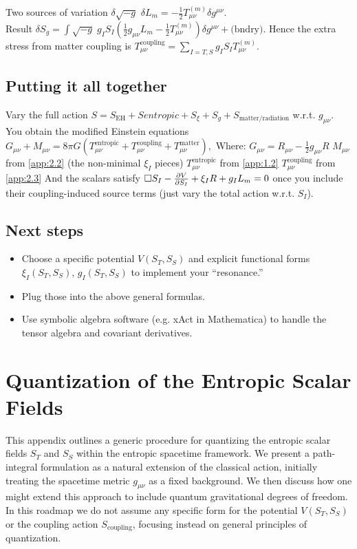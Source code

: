\documentclass[11pt,a4paper]{article} %
\newcommand{\ST}{S_T}
\newcommand{\SSp}{S_S} %
\newcommand{\SEH}{S_{\text{EH}}}
\newcommand{\Smatterradiation}{S_{\text{matter/radiation}}}
\newcommand{\Lm}{L_m}
\newcommand{\Mmu}{M} %
\newcommand{\Tmnentropic}{T^{\text{entropic}}_{\mu\nu}}
\newcommand{\Tmncoupling}{T^{\text{coupling}}_{\mu\nu}}
\newcommand{\Tmnmatter}{T^{\text{matter}}_{\mu\nu}}
\newcommand{\Tmnm}{T^{(m)}_{\mu\nu}} %
\begin{document}
Two sources of variation
$\delta\sqrt{-g}$
$\delta\Lm=-\frac{1}{2}\Tmnm\delta g^{\mu\nu}.$ \\
Result
$\delta S_g =\int\sqrt{-g}\;g_I S_I\left(\frac{1}{2}g_{\mu\nu}\Lm-\frac{1}{2}\Tmnm\right)\delta g^{\mu\nu} +\text{(bndry)}.$
Hence the extra stress from matter coupling is
$\Tmncoupling=\sum_{I=T,S}g_I S_I\Tmnm.$

\subsection{Putting it all together}
\label{app:B.4}
Vary the full action
$S=\SEH+Sentropic+S_\xi+S_g+\Smatterradiation$
w.r.t. $g_{\mu\nu}$. You obtain the modified Einstein equations
$G_{\mu\nu}+\Mmu_{\mu\nu}=8\pi G(\Tmnentropic+\Tmncoupling+\Tmnmatter),$
Where:
$G_{\mu\nu}=R_{\mu\nu}-\frac{1}{2}g_{\mu\nu}R$
$\Mmu_{\mu\nu}$ from \cref{app:2.2} (the non-minimal $\xi_I$ pieces)
$\Tmnentropic$ from \cref{app:1.2}
$\Tmncoupling$ from \cref{app:2.3}
And the scalars satisfy
$\Box S_I-\pdv{V}{S_I}+\xi_I R+g_I\Lm=0$
once you include their coupling-induced source terms (just vary the total action w.r.t. $S_I$).

\subsection{Next steps}
\begin{itemize}
    \item Choose a specific potential $V(\ST,\SSp)$ and explicit functional forms $\xi_I(\ST,\SSp)$, $g_I(\ST,\SSp)$ to implement your ``resonance.''
    \item Plug those into the above general formulas.
    \item Use symbolic algebra software (e.g. xAct in Mathematica) to handle the tensor algebra and covariant derivatives.
\end{itemize}

\section{Quantization of the Entropic Scalar Fields}

This appendix outlines a generic procedure for quantizing the entropic scalar fields \(S_T\) and \(S_S\) within the entropic spacetime framework. We present a path-integral formulation as a natural extension of the classical action, initially treating the spacetime metric \(g_{\mu\nu}\) as a fixed background. We then discuss how one might extend this approach to include quantum gravitational degrees of freedom. In this roadmap we do not assume any specific form for the potential \(V(S_T, S_S)\) or the coupling action \(S_{\mathrm{coupling}}\), focusing instead on general principles of quantization.
\end{document}
